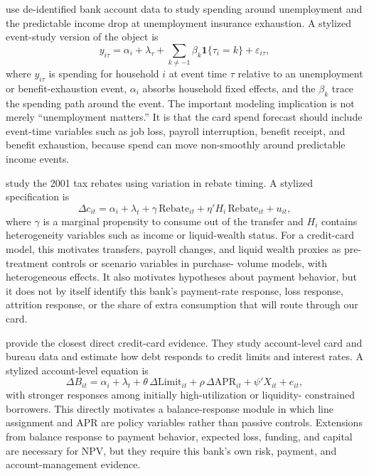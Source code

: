 \documentclass[11pt]{article}
\newcommand{\1}{\mathbf{1}}
\begin{document}
\citet{ganong2019unemployment} use de-identified bank account data to study
spending around unemployment and the predictable income drop at unemployment
insurance exhaustion. A stylized event-study version of the object is
\begin{equation}
  y_{i\tau}
  =
  \alpha_i + \lambda_\tau
  + \sum_{k \neq -1} \beta_k \1\{\tau_i = k\}
  + \varepsilon_{i\tau},
  \label{eq:unemployment-event-study}
\end{equation}
where $y_{i\tau}$ is spending for household $i$ at event time $\tau$ relative to
an unemployment or benefit-exhaustion event, $\alpha_i$ absorbs household fixed
effects, and the $\beta_k$ trace the spending path around the event. The
important modeling implication is not merely ``unemployment matters.'' It is
that the card spend forecast should include event-time variables such as job
loss, payroll interruption, benefit receipt, and benefit exhaustion, because
spend can move non-smoothly around predictable income events.

\citet{johnson2004rebates} study the 2001 tax rebates using variation in rebate
timing. A stylized specification is
\begin{equation}
  \Delta c_{it}
  =
  \alpha_i + \lambda_t
  + \gamma\,\mathrm{Rebate}_{it}
  + \eta' H_i\,\mathrm{Rebate}_{it}
  + u_{it},
  \label{eq:rebate-mpc}
\end{equation}
where $\gamma$ is a marginal propensity to consume out of the transfer and
$H_i$ contains heterogeneity variables such as income or liquid-wealth status.
For a credit-card model, this motivates transfers, payroll changes, and liquid
wealth proxies as pre-treatment controls or scenario variables in purchase-
volume models, with heterogeneous effects. It also motivates hypotheses about
payment behavior, but it does not by itself identify this bank's payment-rate
response, loss response, attrition response, or the share of extra consumption
that will route through our card.

\citet{gross2001liquidity} provide the closest direct credit-card evidence.
They study account-level card and bureau data and estimate how debt responds to
credit limits and interest rates. A stylized account-level equation is
\begin{equation}
  \Delta B_{it}
  =
  \alpha_i + \lambda_t
  + \theta\,\Delta \mathrm{Limit}_{it}
  + \rho\,\Delta \mathrm{APR}_{it}
  + \psi' X_{it}
  + e_{it},
  \label{eq:limit-apr-response}
\end{equation}
with stronger responses among initially high-utilization or liquidity-
constrained borrowers. This directly motivates a balance-response module in
which line assignment and APR are policy variables rather than passive
controls. Extensions from balance response to payment behavior, expected loss,
funding, and capital are necessary for NPV, but they require this bank's own
risk, payment, and account-management evidence.
\end{document}
